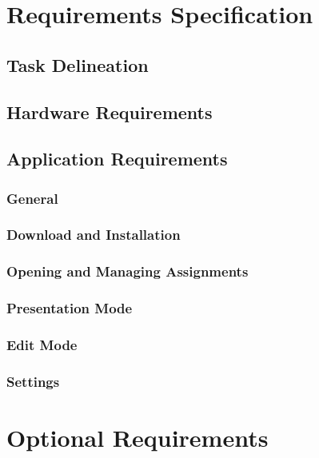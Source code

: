 \documentclass[ms,twoside,print]{nuthesis}
\begin{document}
\appendix
\chapter{Requirements Specification}
\section{Task Delineation}


\section{Hardware Requirements}


\section{Application Requirements}


\subsection{General}


\subsection{Download and Installation}


\subsection{Opening and Managing Assignments}


\subsection{Presentation Mode}


\subsection{Edit Mode}


\subsection{Settings}


\chapter{Optional Requirements}


\backmatter



\end{document}
